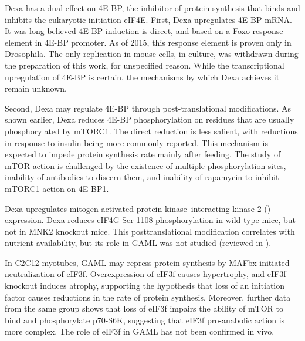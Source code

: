 \documentclass[12pt,english]{report}\usepackage[]{graphicx}\usepackage[]{color}
\begin{document}
Dexa has a dual effect on 4E-BP, the inhibitor of protein synthesis
that binds and inhibits the eukaryotic initiation eIF4E. First, Dexa
upregulates 4E-BP mRNA\citep{wu2010redd1}. It was long believed 4E-BP
induction is direct, and based on a Foxo response element in 4E-BP
promoter\citep{bai2013activin}. As of 2015, this response element
is proven only in Drosophila. The only replication in mouse cells,
in culture, was withdrawn during the preparation of this work, for
unspecified reason. While the transcriptional upregulation of 4E-BP
is certain, the mechanisms by which Dexa achieves it remain unknown.

Second, Dexa may regulate 4E-BP through post-translational modifications.
As shown earlier, Dexa reduces 4E-BP phosphorylation on residues that
are usually phosphorylated by mTORC1. The direct reduction is less
salient, with reductions in response to insulin being more commonly
reported. This mechanism is expected to impede protein synthesis rate
mainly after feeding. The study of mTOR action is challenged by the
existence of multiple phosphorylation sites, inability of antibodies
to discern them, and inability of rapamycin to inhibit mTORC1 action
on 4E-BP1\citep{livingstone2012rapamycin-insensitive}.

Dexa upregulates mitogen-activated protein kinase–interacting kinase
2 ()
expression\citep{hu2012mnk2}. Dexa reduces eIF4G Ser 1108 phosphorylation
in wild type mice, but not in MNK2 knockout mice. This posttranslational
modification correlates with nutrient availability, but its role in
GAML was not studied (reviewed in \citep{vary2007nutrient}).

In C2C12 myotubes, GAML may repress protein synthesis by MAFbx-initiated
neutralization of eIF3f\citep{lagirand-cantaloube2008initiation}.
Overexpression of eIF3f causes hypertrophy, and eIF3f knockout induces
atrophy, supporting the hypothesis that loss of an initiation factor
causes reductions in the rate of protein synthesis. Moreover, further
data from the same group shows that loss of eIF3f impairs the ability
of mTOR to bind and phosphorylate p70-S6K, suggesting that eIF3f pro-anabolic
action is more complex\citep{csibi2010translation}. The role of eIF3f
in GAML has not been confirmed in vivo.
\end{document}
